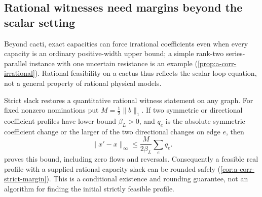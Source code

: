 \subsection{Rational witnesses need margins beyond the scalar setting}

Beyond cacti, exact capacities can force irrational coefficients even
when every capacity is an ordinary positive-width upper bound; a simple
rank-two series-parallel instance with one uncertain resistance is an
example (\cref{prop:a-corr-irrational}). Rational feasibility on a
cactus thus reflects the scalar loop equation, not a general property
of rational physical models.

Strict slack restores a quantitative rational witness statement on
any graph. For fixed nonzero nominations put $M=\tfrac12\|b\|_1$.
If two symmetric or directional coefficient profiles have lower bound
$\beta_L>0$, and $q_e$ is the absolute symmetric coefficient change
or the larger of the two directional changes on edge $e$, then
\begin{equation}
 \|x'-x\|_\infty\le\frac{M}{2\beta_L}\sum_e q_e.
 \label{eq:main-sensitivity}
\end{equation}
 proves this bound, including zero flows and
reversals. Consequently a feasible real profile with a supplied rational
capacity slack can be rounded safely (\cref{cor:a-corr-strict-margin}).
This is a conditional existence and rounding guarantee, not an
algorithm for finding the initial strictly feasible profile.
